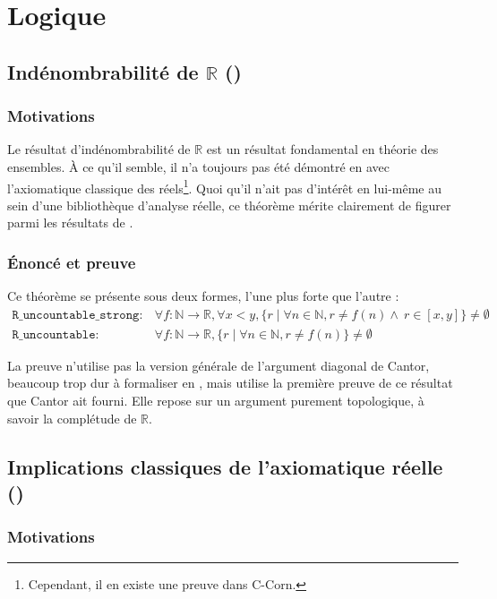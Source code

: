 \section{Logique}

\subsection{Indénombrabilité de $\mathbb{R}$ ()}

\subsubsection{Motivations}

Le résultat d'indénombrabilité de $\mathbb{R}$ est un résultat fondamental en théorie des ensembles. À ce qu'il semble, il n'a toujours pas été démontré en \coq avec l'axiomatique classique des réels\footnote{Cependant, il en existe une preuve dans C-Corn.}. Quoi qu'il n'ait pas d'intérêt en lui-même au sein d'une bibliothèque d'analyse réelle, ce théorème mérite clairement de figurer parmi les résultats de .

\subsubsection{Énoncé et preuve}

Ce théorème se présente sous deux formes, l'une plus forte que l'autre :
$$\begin{array}{ll}
\mathtt{R\_uncountable\_strong} :& \forall f : \mathbb{N}\rightarrow\mathbb{R}, \forall x < y, \{r\mid\forall n\in\mathbb{N}, r \neq f(n) \wedge\ r\in[x, y]\}\neq\emptyset\\
\mathtt{R\_uncountable} :& \forall f : \mathbb{N}\rightarrow\mathbb{R}, \{r\mid\forall n\in\mathbb{N}, r \neq f(n)\}\neq\emptyset
\end{array}$$

La preuve n'utilise pas la version générale de l'argument diagonal de Cantor, beaucoup trop dur à formaliser en \coq, mais utilise la première preuve de ce résultat que Cantor ait fourni. Elle repose sur un argument purement topologique, à savoir la complétude de $\mathbb{R}$.

\subsection{Implications classiques de l'axiomatique réelle ()}

\subsubsection{Motivations}

